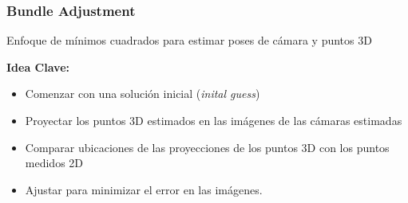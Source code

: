 \begin{frame}
    \frametitle{Bundle Adjustment}
    
    Enfoque de mínimos cuadrados para estimar poses de cámara y puntos 3D
    
    \textbf{Idea Clave:}
    \begin{itemize}
        \item Comenzar con una solución inicial (\emph{inital guess})
        \item Proyectar los puntos 3D estimados en las imágenes de las cámaras estimadas
        \item Comparar ubicaciones de las proyecciones de los puntos 3D con los puntos medidos 2D
        \item Ajustar para minimizar el error en las imágenes.
    \end{itemize}
    
\end{frame}


